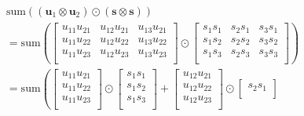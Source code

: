 \begin{align*}
   & \mathrm{sum}\left((\textbf{u}_1 \otimes \textbf{u}_2) \odot (\textbf{s} \otimes \textbf{s} )\right)                                                             \\
   & = \mathrm{sum}\left(\begin{bmatrix}
                    u_{11}u_{21} & u_{12}u_{21} & u_{13}u_{21} \\
                    u_{11}u_{22} & u_{12}u_{22} & u_{13}u_{22} \\
                    u_{11}u_{23} & u_{12}u_{23} & u_{13}u_{23} \\
                  \end{bmatrix} \odot \begin{bmatrix}
                                        s_{1}s_{1} & s_{2}s_{1} & s_{3}s_{1} \\
                                        s_{1}s_{2} & s_{2}s_{2} & s_{3}s_{2} \\
                                        s_{1}s_{3} & s_{2}s_{3} & s_{3}s_{3} \\
                                      \end{bmatrix}\right)                                                                                 \\
   & = \mathrm{sum}\left(\begin{bmatrix}
                    u_{11}u_{21} \\
                    u_{11}u_{22} \\
                    u_{11}u_{23} \\
                  \end{bmatrix} \odot \begin{bmatrix}
                                        s_{1}s_{1} \\
                                        s_{1}s_{2} \\
                                        s_{1}s_{3} \\
                                      \end{bmatrix}
  + \begin{bmatrix}
        u_{12}u_{21} \\
        u_{12}u_{22} \\
        u_{12}u_{23} \\
      \end{bmatrix} \odot \begin{bmatrix}
                            s_{2}s_{1} \\

\end{bmatrix}
\end{align*}
